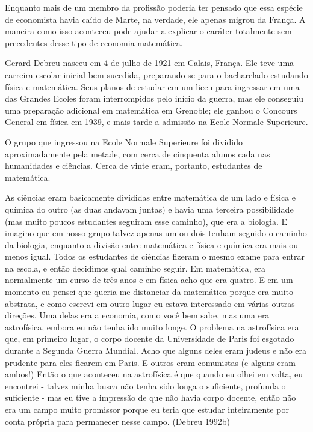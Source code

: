 \documentclass[12pt]{article}
\begin{document}
Enquanto mais de um membro da profissão poderia ter pensado que essa espécie de economista havia caído de Marte, na verdade, ele apenas migrou da França. A maneira como isso aconteceu pode ajudar a explicar o caráter totalmente sem precedentes desse tipo de economia matemática.

Gerard Debreu nasceu em 4 de julho de 1921 em Calais, França. Ele teve uma carreira escolar inicial bem-sucedida, preparando-se para o bacharelado estudando física e matemática. Seus planos de estudar em um liceu para ingressar em uma das Grandes Ecoles foram interrompidos pelo início da guerra, mas ele conseguiu uma preparação adicional em matemática em Grenoble; ele ganhou o Concours General em física em 1939, e mais tarde a admissão na Ecole Normale Superieure.

O grupo que ingressou na Ecole Normale Superieure foi dividido aproximadamente pela metade, com cerca de cinquenta alunos cada nas humanidades e ciências. Cerca de vinte eram, portanto, estudantes de matemática.

As ciências eram basicamente divididas entre matemática de um lado e física e química do outro (as duas andavam juntas) e havia uma terceira possibilidade (mas muito poucos estudantes seguiram esse caminho), que era a biologia. E imagino que em nosso grupo talvez apenas um ou dois tenham seguido o caminho da biologia, enquanto a divisão entre matemática e física e química era mais ou menos igual. Todos os estudantes de ciências fizeram o mesmo exame para entrar na escola, e então decidimos qual caminho seguir. Em matemática, era normalmente um curso de três anos e em física acho que era quatro. E em um momento eu pensei que queria me distanciar da matemática porque era muito abstrata, e como escrevi em outro lugar eu estava interessado em várias outras direções. Uma delas era a economia, como você bem sabe, mas uma era astrofísica, embora eu não tenha ido muito longe. O problema na astrofísica era que, em primeiro lugar, o corpo docente da Universidade de Paris foi esgotado durante a Segunda Guerra Mundial. Acho que alguns deles eram judeus e não era prudente para eles ficarem em Paris. E outros eram comunistas (e alguns eram ambos!) Então o que aconteceu na astrofísica é que quando eu olhei em volta, eu encontrei - talvez minha busca não tenha sido longa o suficiente, profunda o suficiente - mas eu tive a impressão de que não havia corpo docente, então não era um campo muito promissor porque eu teria que estudar inteiramente por conta própria para permanecer nesse campo. (Debreu 1992b)
\end{document}
